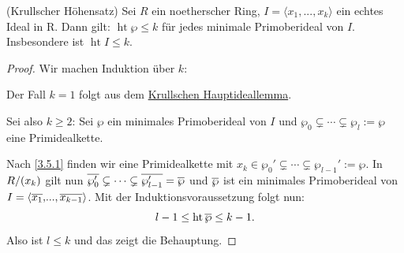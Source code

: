 \documentclass[a4paper,12pt,index=toc]{scrbook}
\theoremstyle{keinenummern} %
\newcommand{\hoehe}{\operatorname{ht}}
\renewcommand{\dotsc}{\ensuremath{\!...}}
\def\Bar#1{\ensuremath\overline{#1}}
\begin{document}
\begin{prop}\label{3.5.3}(Krullscher Höhensatz)
Sei $R$ ein noetherscher Ring, $I=\langle x_1,\dotsc,x_k\rangle$ ein echtes Ideal in R. Dann gilt: $\hoehe \wp\leq k$ für jedes minimale Primoberideal von $I$. Insbesondere ist $\hoehe I\leq k$.
\end{prop}
\begin{proof} Wir machen Induktion über $k$:

Der Fall $k=1$ folgt aus dem \hyperref[khil]{Krullschen Hauptideallemma}.

Sei also $k\ge 2$: Sei $\wp$ ein minimales Primoberideal von $I$ und $\wp_0\subsetneq \dotsm \subsetneq \wp_l:=\wp$ eine Primidealkette.

Nach \cref{3.5.1} finden wir eine Primidealkette mit $x_{k}\in\wp_0'\subsetneq \dotsm \subsetneq \wp_{l-1}':=\wp$. In $\Quotient{R}{(x_{k})}$ gilt nun $\Bar{\wp_0'}\subsetneq \dotsm \subsetneq \Bar{\wp_{l-1}'}=\Bar{\wp}$ und $\Bar{\wp}$ ist ein minimales Primoberideal von $I=\langle\Bar{x_1},\dotsc,\Bar{x_{k-1}}\rangle$. Mit der Induktionsvoraussetzung folgt nun: 
\begin{equation*}l-1\leq \hoehe \Bar{\wp}\leq k-1.\end{equation*}
Also ist $l\leq k$ und das zeigt die Behauptung.
\end{proof}
\end{document}

